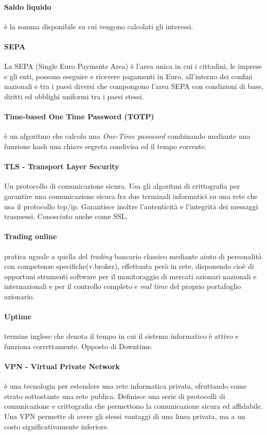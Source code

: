 \paragraph{Saldo liquido} \label{glossario:saldo-liquido}
	\`e la somma disponibile su cui vengono calcolati gli interessi.
\paragraph{SEPA}
	La SEPA (Single Euro Payments Area) è l’area unica in cui i cittadini, le imprese e gli enti, possono eseguire e ricevere pagamenti in Euro, all’interno dei confini nazionali e tra i paesi diversi che compongono l’area SEPA con condizioni di base, diritti ed obblighi uniformi tra i paesi stessi. 
\paragraph{Time-based One Time Password (TOTP)}
	è un algoritmo che calcola una \emph{One-Time password} combinando mediante una funzione hash una chiave segreta condivisa ed il tempo corrente. \cite{totprfc}
\paragraph{TLS - Transport Layer Security}
Un protocollo di comunicazione sicura. Usa gli algoritmi di crittografia per garantire una comunicazione sicura fra due terminali informatici su una rete che usa il protocollo tcp/ip.
Garantisce inoltre l'autenticit\`a e l'integrit\`a dei messaggi trasmessi.
Conosciuto anche come SSL.
\paragraph{Trading online}
	pratica uguale a quella del \emph{trading} bancario classico mediante aiuto di personalità con competenze specifiche(v.broker), effettuata però in rete, disponendo cioè di opportuni strumenti software per il monitoraggio di mercati azionari nazionali e internazionali e  per il controllo completo e \emph{real time} del proprio portafoglio azionario.
\paragraph{Uptime}
    termine inglese che denota il tempo in cui il sistema informatico \`e attivo e funziona correttamente.
    Opposto di Downtime.


\paragraph{VPN - Virtual Private Network}
        \`e una tecnologia per estendere una rete informatica privata, sfruttando come strato sottostante una rete publica.
    Definisce una serie di protocolli di comunicazione e crittografia che permettono la comunicazione sicura ed affidabile.
    Una VPN permette di avere gli stessi vantaggi di una linea privata, ma a un costo significativamente inferiore.
